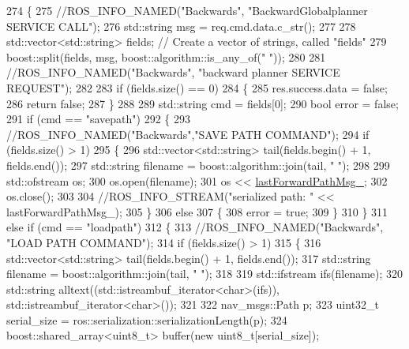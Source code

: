 \begin{DoxyCode}
274 \{
275     \textcolor{comment}{//ROS\_INFO\_NAMED("Backwards", "BackwardGlobalplanner SERVICE CALL");}
276     std::string msg = req.cmd.data.c\_str();
277 
278     std::vector<std::string> fields; \textcolor{comment}{// Create a vector of strings, called "fields"}
279     boost::split(fields, msg, boost::algorithm::is\_any\_of(\textcolor{stringliteral}{" "}));
280 
281     \textcolor{comment}{//ROS\_INFO\_NAMED("Backwards", "backward planner SERVICE REQUEST");}
282 
283     \textcolor{keywordflow}{if} (fields.size() == 0)
284     \{
285         res.success.data = \textcolor{keyword}{false};
286         \textcolor{keywordflow}{return} \textcolor{keyword}{false};
287     \}
288 
289     std::string cmd = fields[0];
290     \textcolor{keywordtype}{bool} error = \textcolor{keyword}{false};
291     \textcolor{keywordflow}{if} (cmd == \textcolor{stringliteral}{"savepath"})
292     \{
293         \textcolor{comment}{//ROS\_INFO\_NAMED("Backwards","SAVE PATH COMMAND");}
294         \textcolor{keywordflow}{if} (fields.size() > 1)
295         \{
296             std::vector<std::string> tail(fields.begin() + 1, fields.end());
297             std::string filename = boost::algorithm::join(tail, \textcolor{stringliteral}{" "});
298 
299             std::ofstream os;
300             os.open(filename);
301             os << \hyperlink{classmove__base__z__client_1_1backward__global__planner_1_1BackwardGlobalPlanner_a058da13b9ee6b1d878830503e67de638}{lastForwardPathMsg\_};
302             os.close();
303 
304             \textcolor{comment}{//ROS\_INFO\_STREAM("serialized path: " << lastForwardPathMsg\_);}
305         \}
306         \textcolor{keywordflow}{else}
307         \{
308             error = \textcolor{keyword}{true};
309         \}
310     \}
311     \textcolor{keywordflow}{else} \textcolor{keywordflow}{if} (cmd == \textcolor{stringliteral}{"loadpath"})
312     \{
313         \textcolor{comment}{//ROS\_INFO\_NAMED("Backwards", "LOAD PATH COMMAND");}
314         \textcolor{keywordflow}{if} (fields.size() > 1)
315         \{
316             std::vector<std::string> tail(fields.begin() + 1, fields.end());
317             std::string filename = boost::algorithm::join(tail, \textcolor{stringliteral}{" "});
318 
319             std::ifstream ifs(filename);
320             std::string alltext((std::istreambuf\_iterator<char>(ifs)), std::istreambuf\_iterator<char>());
321 
322             nav\_msgs::Path p;
323             uint32\_t serial\_size = ros::serialization::serializationLength(p);
324             boost::shared\_array<uint8\_t> buffer(\textcolor{keyword}{new} uint8\_t[serial\_size]);

\end{DoxyCode}
